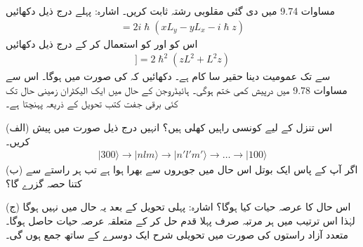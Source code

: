 مساوات \num{9.74} میں دی گئی  مقلوبی  رشتہ ثابت کریں۔ اشارہ: پہلے درج ذیل دکھائیں
\begin{align*}
	[L^2, z] = 2i\hslash(xL_y-yL_x-i\hslash z)
\end{align*}
اس کو اور  کو استعمال کر کے درج ذیل دکھائیں
\begin{align*}
[L^2, [L^2, z]] = 2\hslash^2(zL^2+L^2z)	
\end{align*}
 سے  تک عمومیت دینا حقیر سا  کام ہے۔
دکھائیں کہ  کی صورت میں  ہوگا۔ اس سے مساوات \num{9.78} میں درپیش کمی ختم ہوگی۔
ہائیڈروجن کے  حال میں ایک الیکٹران زمینی حال تک کئی برقی جفت کتب تحویل کے ذریعہ  پہنچتا ہے۔

(الف) اس تنزل کے لیے کونسی راہیں کھلی ہیں؟ انہیں درج ذیل صورت میں پیش کریں۔
\begin{align*}
	|300\rangle\to | nlm\rangle\to | n'l'm'\rangle\to\dots\to|100\rangle
\end{align*}
(ب) اگر آپ کے پاس ایک بوتل اس حال میں جوہروں سے بھرا ہوا ہے تب ہر راستے سے کتنا حصہ گزرے گا؟

(ج) اس حال کا عرصہ حیات کیا ہوگا؟ اشارہ: پہلی تحویل کے بعد یہ حال  میں نہیں ہوگا لہٰذا اس ترتیب میں ہر  مرتبہ  صرف پہلا قدم حل کر کے متعلقہ عرصہ حیات حاصل ہوگا۔ متعدد آزاد راستوں کی صورت میں تحویلی شرح ایک دوسرے کے ساتھ جمع ہوں گی۔


